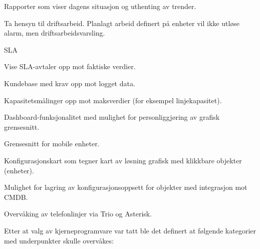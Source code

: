 \begin{itemize*}
	\item Rapporter som viser dagens situasjon og uthenting av trender.
	\item Ta hensyn til driftsarbeid. Planlagt arbeid definert på enheter vil ikke utløse alarm, men driftsarbeidsvarsling.
	\item SLA
	\begin{itemize*}
		\item Vise SLA-avtaler opp mot faktiske verdier.
		\item Kundebase med krav opp mot logget data.
		\item Kapasitetsmålinger opp mot maksverdier (for eksempel linjekapasitet).
	\end{itemize*}
	\item Dashboard-funksjonalitet med mulighet for personliggjøring av grafisk grensesnitt.
	\item Grensesnitt for mobile enheter.
	\item Konfigurasjonskart som tegner kart av løsning grafisk med klikkbare objekter (enheter).
	\item Mulighet for lagring av konfigurasjonsoppsett for objekter med integrasjon mot CMDB.
	\item Overvåking av telefonlinjer via Trio og Asterisk.
\end{itemize*}

Etter at valg av kjerneprogramvare var tatt ble det definert at følgende kategorier med underpunkter skulle overvåkes:

